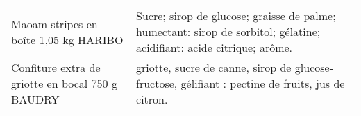 \begin{longtable}{p{5cm}p{10cm}}
                                                                    Maoam stripes en boîte 1,05 kg HARIBO &                                                                                                                                                                                                                                                                                                                                                                                                                                                                                                                                                                                                                                                                                                                                                                                                                                                                                                                    Sucre; sirop de glucose; graisse de palme; humectant: sirop de sorbitol; gélatine; acidifiant: acide citrique; arôme. \\
                                                         Confiture extra de griotte en bocal 750 g BAUDRY &                                                                                                                                                                                                                                                                                                                                                                                                                                                                                                                                                                                                                                                                                                                                                                                                                                                                                                                                        griotte, sucre de canne, sirop de glucose-fructose, gélifiant : pectine de fruits, jus de citron. \\

\end{longtable}
